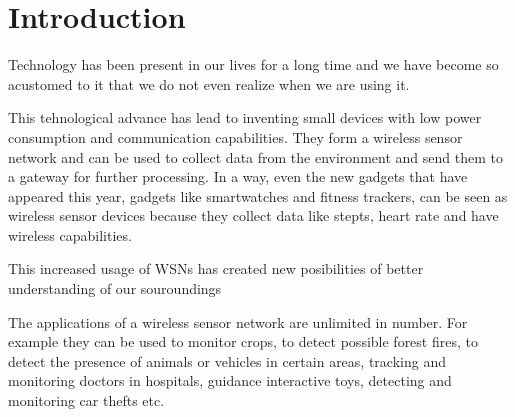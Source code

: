 \normalfont\normalsize
\chapter{Introduction}

Technology has been present in our lives for a long time and we have become so acustomed to it that we do not even realize when we are using it.

This tehnological advance has lead to inventing small devices with low power consumption and communication capabilities. They form a wireless sensor network and can be used to collect data from the environment and send them to a gateway for further processing. In a way, even the new gadgets that have appeared this year, gadgets like smartwatches and fitness trackers, can be seen as wireless sensor devices because they collect data like stepts, heart rate and have wireless capabilities.

This increased usage of WSNs has created new posibilities of better understanding of our souroundings

The applications of a wireless sensor network are unlimited in number. For example they can be used to monitor crops, to detect possible forest fires, to detect the presence of animals or vehicles in certain areas, tracking and monitoring doctors in hospitals, guidance interactive toys, detecting and monitoring car thefts etc.
